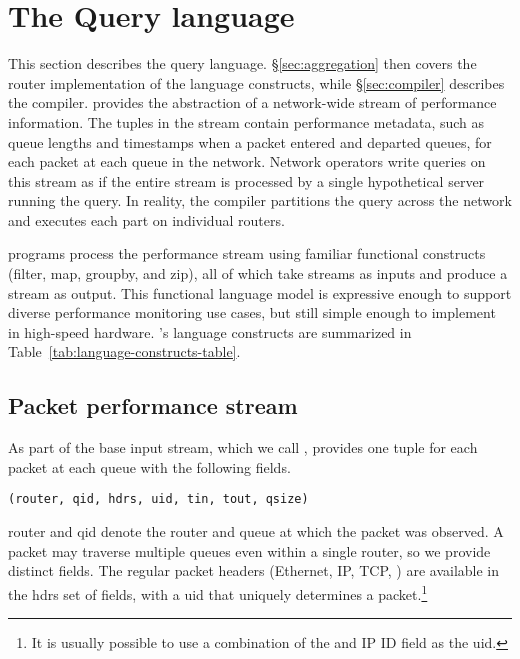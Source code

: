 \section{The \TheSystem Query language}
\label{sec:language}
This section describes the \TheSystem query language.  \S\ref{sec:aggregation}
then covers the router implementation of the language constructs, while
\S\ref{sec:compiler} describes the compiler.  \TheSystem provides the
abstraction of a network-wide stream of performance information. The tuples in
the stream contain performance metadata, such as queue lengths and timestamps
when a packet entered and departed queues, for each packet at each queue in the
network. Network operators write queries on this stream as if the entire stream
is processed by a single hypothetical server running the query. In reality, the
compiler partitions the query across the network and executes each part on
individual routers.

\TheSystem programs process the performance stream using familiar functional
constructs ({\ct filter}, {\ct map}, {\ct groupby}, and {\ct zip}), all of
which take streams as inputs and produce a stream as output. This functional
language model is expressive enough to support diverse performance monitoring
use cases, but still simple enough to implement in high-speed hardware.
\TheSystem's language constructs are summarized in
Table~\ref{tab:language-constructs-table}.



\subsection{Packet performance stream} As part of the base input stream, which we
call {\ct \pktlog}, \TheSystem provides one tuple for each packet at each queue
with the following fields.

\begin{lstlisting}
(router, qid, hdrs, uid, tin, tout, qsize)
\end{lstlisting}

{\ct router} and {\ct qid} denote the router and queue at which the
packet was observed. A packet may traverse multiple queues even within a single
router, so we provide distinct fields. The regular packet headers (Ethernet,
IP, TCP, \etc) are available in the {\ct hdrs} set of fields, with a {\ct uid}
that uniquely determines a packet.\footnote{It is usually possible to
use a combination of the \txtftuple and IP ID field as the {\ctfoot uid}.}

